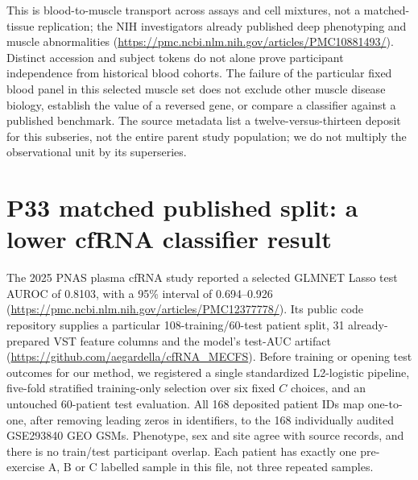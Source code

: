 \documentclass[11pt,a4paper]{article}
\begin{document}
This is blood-to-muscle transport across assays and cell mixtures, not a matched-tissue replication; the NIH investigators already published deep phenotyping and muscle abnormalities (\url{https://pmc.ncbi.nlm.nih.gov/articles/PMC10881493/}). Distinct accession and subject tokens do not alone prove participant independence from historical blood cohorts. The failure of the particular fixed blood panel in this selected muscle set does not exclude other muscle disease biology, establish the value of a reversed gene, or compare a classifier against a published benchmark. The source metadata list a twelve-versus-thirteen deposit for this subseries, not the entire parent study population; we do not multiply the observational unit by its superseries.

\section{P33 matched published split: a lower cfRNA classifier result}
The 2025 PNAS plasma cfRNA study reported a selected GLMNET Lasso test AUROC of 0.8103, with a 95\% interval of 0.694--0.926 (\url{https://pmc.ncbi.nlm.nih.gov/articles/PMC12377778/}). Its public code repository supplies a particular 108-training/60-test patient split, 31 already-prepared VST feature columns and the model's test-AUC artifact (\url{https://github.com/aegardella/cfRNA_MECFS}). Before training or opening test outcomes for our method, we registered a single standardized L2-logistic pipeline, five-fold stratified training-only selection over six fixed $C$ choices, and an untouched 60-patient test evaluation. All 168 deposited patient IDs map one-to-one, after removing leading zeros in identifiers, to the 168 individually audited GSE293840 GEO GSMs. Phenotype, sex and site agree with source records, and there is no train/test participant overlap. Each patient has exactly one pre-exercise A, B or C labelled sample in this file, not three repeated samples.
\end{document}
